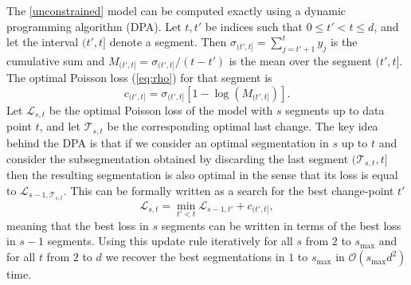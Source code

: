\documentclass{article}
\begin{document}
The \ref{unconstrained} model can be computed exactly using a dynamic
programming algorithm (DPA).
Let $t,t'$ be indices such that $0\leq t' < t \leq d$, and let the
interval $(t', t]$ denote a segment. Then $\sigma_{(t', t]} =
\sum_{j=t'+1}^t y_j$ is the cumulative sum and $M_{(t', t]} =
\sigma_{(t', t]}/(t-t')$ is the mean over the segment $(t', t]$. The
optimal Poisson loss (\ref{eq:rho}) for that segment is
\begin{equation}
  \label{eq:log-lik-segment}
  c_{(t',t]} = \sigma_{(t', t]}\left[1 - 
  \log\left(M_{(t', t]}\right)\right].
\end{equation}
Let ${\mathcal L}_{s, t}$ be the optimal Poisson loss of the model
with $s$ segments up to data point $t$, and let ${\mathcal T}_{s, t}$
be the corresponding optimal last change. The key idea behind the DPA
is that if we consider an optimal segmentation in $s$ up to $t$ and
consider the subsegmentation obtained by discarding the last segment
$({\mathcal T}_{s, t}, t]$ then the resulting segmentation is also
optimal in the sense that its loss is equal to ${\mathcal L}_{s-1,
  {\mathcal T}_{s, t}}.$
This can be formally written as a search for the best
change-point $t'$
\begin{equation}
{\mathcal{L}}_{s,t}= \min_{t' < t}
{\mathcal{L}}_{s-1,t'} +
 c_{(t',t]}, 
 \label{eq:update1}
\end{equation}
meaning that the best loss in $s$ segments can be written in terms of
the best loss in $s-1$ segments. Using this update
rule iteratively for all $s$ from $2$ to $s_{\text{max}}$ and for all
$t$ from $2$ to $d$ we recover the best segmentations in $1$ to
$s_{\text{max}}$ in $\mathcal{O}(s_{\text{max}}d^2)$ time.

\end{document}
